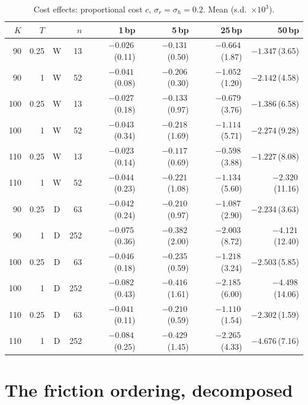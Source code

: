 \documentclass{article}
\newcommand{\bps}{\,bp}
\begin{document}
\begin{table}[h]
  \caption{Cost effects: proportional cost $c$, $\sigma_r = \sigma_h = 0.2$. Mean (s.d.\
    $\times 10^{3}$).}
  \label{tab:sweep-cost}
  \centering
  \footnotesize
  \begin{tabular}{rrcr rrrr}
    \toprule
    $K$ & $T$ & & $n$ & 1\bps{} & 5\bps{} & 25\bps{} & 50\bps{} \\
    \midrule
    90 & 0.25 & W & 13 & $-0.026$\,(0.11) & $-0.131$\,(0.50) & $-0.664$\,(1.87) & $-1.347$\,(3.65) \\
    90 & 1 & W & 52 & $-0.041$\,(0.08) & $-0.206$\,(0.30) & $-1.052$\,(1.20) & $-2.142$\,(4.58) \\
    100 & 0.25 & W & 13 & $-0.027$\,(0.18) & $-0.133$\,(0.97) & $-0.679$\,(3.76) & $-1.386$\,(6.58) \\
    100 & 1 & W & 52 & $-0.043$\,(0.34) & $-0.218$\,(1.69) & $-1.114$\,(5.71) & $-2.274$\,(9.28) \\
    110 & 0.25 & W & 13 & $-0.023$\,(0.14) & $-0.117$\,(0.69) & $-0.598$\,(3.88) & $-1.227$\,(8.08) \\
    110 & 1 & W & 52 & $-0.044$\,(0.23) & $-0.221$\,(1.08) & $-1.134$\,(5.60) & $-2.320$\,(11.16) \\
    \midrule
    90 & 0.25 & D & 63 & $-0.042$\,(0.24) & $-0.210$\,(0.97) & $-1.087$\,(2.90) & $-2.234$\,(3.63) \\
    90 & 1 & D & 252 & $-0.075$\,(0.36) & $-0.382$\,(2.00) & $-2.003$\,(8.72) & $-4.121$\,(12.40) \\
    100 & 0.25 & D & 63 & $-0.046$\,(0.18) & $-0.235$\,(0.59) & $-1.218$\,(3.24) & $-2.503$\,(5.85) \\
    100 & 1 & D & 252 & $-0.082$\,(0.43) & $-0.416$\,(1.61) & $-2.185$\,(6.00) & $-4.498$\,(14.06) \\
    110 & 0.25 & D & 63 & $-0.041$\,(0.11) & $-0.210$\,(0.59) & $-1.110$\,(1.54) & $-2.302$\,(1.59) \\
    110 & 1 & D & 252 & $-0.084$\,(0.25) & $-0.429$\,(1.45) & $-2.265$\,(4.33) & $-4.676$\,(7.16) \\
    \bottomrule
  \end{tabular}
\end{table}

\section{The friction ordering, decomposed}\label{app:mechanism}
\end{document}
